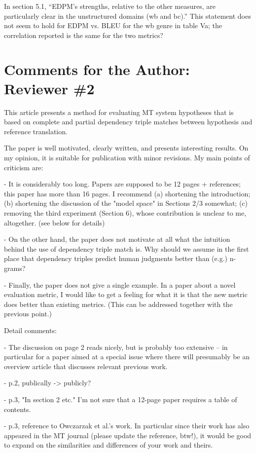 \documentclass[letterpaper,12pt]{article}
\begin{document}
In section 5.1, ``EDPM's strengths, relative to the other measures, are
particularly clear in the unstructured domains (wb and bc).''  This
statement does not seem to hold for EDPM vs. BLEU for the wb genre in
table Va; the correlation reported is the same for the two metrics?

\section{Comments for the Author: Reviewer \#2}
\label{sec:reviewer2}

This article presents a method for evaluating MT system hypotheses
that is based on complete and partial dependency triple matches
between hypothesis and reference translation.

The paper is well motivated, clearly written, and presents interesting
results. On my opinion, it is suitable for publication with minor
revisions. My main points of criticism are:

- It is considerably too long. Papers are supposed to be 12 pages +
 references; this paper has more than 16 pages. I recommend
 (a) shortening the introduction; (b) shortening the discussion
 of the "model space" in Sections 2/3 somewhat; (c) removing the
 third experiment (Section 6), whose contribution is unclear to
 me, altogether. (see below for details)

- On the other hand, the paper does not motivate at all what the
 intuition behind the use of dependency triple match is. Why
 should we assume in the first place that dependency triples
 predict human judgments better than (e.g.) n-grams?

- Finally, the paper does not give a single example. In a paper
 about a novel evaluation metric, I would like to get a feeling
 for what it is that the new metric does better than existing
 metrics. (This can be addressed together with the previous point.)

Detail comments:

- The discussion on page 2 reads nicely, but is probably too
 extensive -- in particular for a paper aimed at a special
 issue where there will presumably be an overview article
 that discusses relevant previous work.

- p.2, publically -> publicly?

- p.3, "In section 2 etc." I'm not sure that a 12-page paper requires
 a table of contents.

- p.3, reference to Owczarzak et al.'s work. In particular since their
 work has also appeared in the MT journal (please update the
 reference, btw!), it would be good to expand on the similarities and
 differences of your work and theirs.
\end{document}
